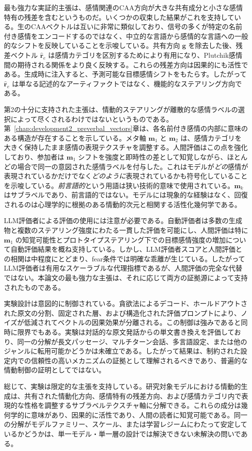 最も強力な実証的主張は、感情関連のCAA方向が大きな共有成分と小さな感情特有の残差を含むというものだ。いくつかの収束した結果がこれを支持している。生のCAAベクトルは互いに非常に類似しており、信号の多くが特定の名前付き感情をエンコードするのではなく、中立的な言語から感情的な言語への一般的なシフトを反映していることを示唆している。共有方向 $\mathbf{g}$ を除去した後、残差ベクトル $\hat{\mathbf{r}}_e$ は感情カテゴリを区別するためにより有用になり、Plutchik感情間の期待される関係をより良く反映する。これらの残差方向は因果的にも活性である。生成時に注入すると、予測可能な目標感情シフトをもたらす。したがって $\hat{\mathbf{r}}_e$ は単なる記述的なアーティファクトではなく、機能的なステアリング方向である。\par

第2の十分に支持された主張は、情動的ステアリングが離散的な感情ラベルの選択によって尽くされるわけではないというものである。第~\ref{chap:development2_preverbal_vectors}章は、各名前付き感情の内部に意味のある構造が存在することを示している。メタ軸 $\mathbf{m}_1$ と $\mathbf{m}_2$ は、感情カテゴリを大きく保持したまま感情の表現テクスチャを調整する。人間評価はこの点を強化しており、参加者は $\mathbf{m}_1$ シフトを強度と即時性の差として知覚しながら、ほとんどの場合で同一の意図された感情ラベルを付与した。これはモデルが\emph{どの}感情が表現されているかだけでなく\emph{どのように}表現されているかも符号化していることを示唆している。\emph{前言語的}という用語は狭い技術的意味で使用されている。$\mathbf{m}_k$ はサブラベルであり、前言語的ではない。モデルには現象的な経験はなく、回復されるのは心理学的に根拠のある情動的次元と相関する活性化幾何学である。\par

LLM評価者による評価の使用には注意が必要である。自動評価者は多数の生成物と複数のステアリング強度にわたる一貫した評価を可能にし、人間評価は特に $\mathbf{m}_1$ の知覚可能性とプロトタイプステアリング下での目標感情強度の増加について自動評価結果を概ね支持している。しかし、LLM評価者スコアと人間評価との相関は中程度にとどまり、fear条件では明確な乖離が生じている。したがってLLM評価者は有用なスケーラブルな代理指標であるが、人間評価の完全な代替ではない。本論文の最も強力な主張は、それに応じて両方の証拠源によって支持されたものである。\par

実験設計は意図的に制御されている。貪欲法によるデコード、ホールドアウトされた原文の分割、固定された層、および構造化された評価プロンプトにより、ノイズが低減されてベクトルの因果効果が分離される。この制御は強みであると同時に限界でもある。実験は対話的な原文発話からの単文書き換えを評価しており、同一の分解が長文パッセージ、マルチターン会話、多言語設定、または他のジャンルに転用可能かどうかは未確立である。したがって結果は、制約された設定内での信頼性の高いメカニズムの証拠として理解されるべきであり、普遍的な情動制御の証明としてではない。\par

総じて、実験は限定的な主張を支持している。研究対象モデルにおける情動的生成は、共有された情動化方向、感情特有の残差方向、および感情カテゴリ内で表現的な性格を調整するサブラベルテクスチャ軸に分解できる。これらの成分は幾何学的に意味があり、因果的に活性であり、人間の読者に知覚可能である。同一の分解がモデルファミリー、スケール、または学習レジームにわたって安定しているかどうかは、単一モデル・単一層の設計では解決できない未解決の問いである。\par
